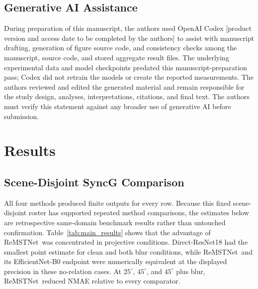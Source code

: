 \documentclass[electronics,article,submit,oneauthor]{Definitions/mdpi}
\newcommand{\modelname}{ReMSTNet}
\begin{document}
\subsection{Generative AI Assistance}

During preparation of this manuscript, the authors used OpenAI Codex [product version and access date to be completed by the authors] to assist with manuscript drafting, generation of figure source code, and consistency checks among the manuscript, source code, and stored aggregate result files. The underlying experimental data and model checkpoints predated this manuscript-preparation pass; Codex did not retrain the models or create the reported measurements. The authors reviewed and edited the generated material and remain responsible for the study design, analyses, interpretations, citations, and final text. The authors must verify this statement against any broader use of generative AI before submission.

\section{Results}
\label{sec:results}

\subsection{Scene-Disjoint SyncG Comparison}
\label{subsec:syncg_results}

All four methods produced finite outputs for every row. Because this fixed scene-disjoint roster has supported repeated method comparisons, the estimates below are retrospective same-domain benchmark results rather than untouched confirmation. Table~\ref{tab:main_results} shows that the advantage of \modelname\ was concentrated in projective conditions. Direct-ResNet18 had the smallest point estimate for clean and both blur conditions, while \modelname\ and its EfficientNet-B0 endpoint were numerically equivalent at the displayed precision in these no-relation cases. At $25^{\circ}$, $45^{\circ}$, and $45^{\circ}$ plus blur, \modelname\ reduced NMAE relative to every comparator.
\end{document}
